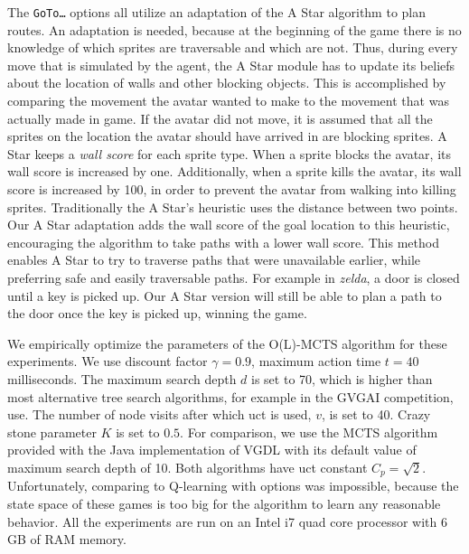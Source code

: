 The \texttt{GoTo\ldots} options all utilize an adaptation of the A Star
algorithm to plan routes. An adaptation is needed, because at the beginning of
the game there is no knowledge of which sprites are traversable and which are
not. Thus, during every move that is simulated by the agent, the A Star module
has to update its beliefs about the location of walls and other blocking
objects. This is accomplished by comparing the movement the avatar wanted to
make to the movement that was actually made in game. If the avatar did not move,
it is assumed that all the sprites on the location the avatar should have
arrived in are blocking sprites. A Star keeps a \emph{wall score} for each
sprite type. When a sprite blocks the avatar, its wall score is increased by
one. Additionally, when a sprite kills the avatar, its wall score is increased
by 100, in order to prevent the avatar from walking into killing sprites.
Traditionally the A Star's heuristic uses the distance between two points. Our A
Star adaptation adds the wall score of the goal location to this heuristic,
encouraging the algorithm to take paths with a lower wall score. This method
enables A Star to try to traverse paths that were unavailable earlier, while
preferring safe and easily traversable paths. For example in \textit{zelda}, a
door is closed until a key is picked up. Our A Star version will still be able
to plan a path to the door once the key is picked up, winning the game.

We empirically optimize the parameters of the O(L)-MCTS algorithm
for these experiments. We use discount factor $\gamma = 0.9$, maximum action
time $t = 40$ milliseconds. The maximum search depth $d$ is set to 70, which is
higher than most alternative tree search algorithms, for example in the GVGAI
competition, use. The number of node visits after which \textsf{uct} is used,
$v$, is set to 40. Crazy stone parameter $K$ is set to $0.5$.  For comparison,
we use the MCTS algorithm provided with the Java implementation of VGDL with its
default value of maximum search depth of 10. Both algorithms have \textsf{uct}
constant $C_p = \sqrt{2}$. Unfortunately, comparing to Q-learning with options
was impossible, because the state space of these games is too big for the
algorithm to learn any reasonable behavior. All the experiments are run on an
Intel i7  quad core processor with 6 GB of RAM memory.

